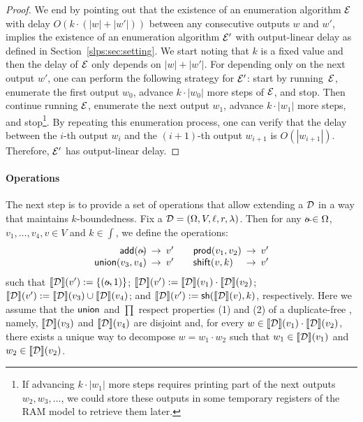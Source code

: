 \begin{proof}
	We end by pointing out that the existence of an enumeration algorithm $\mathcal{E}$ with delay $O(k\cdot (|w| + |w'|))$ between any consecutive outputs $w$ and $w'$, implies the existence of an enumeration algorithm $\mathcal{E}'$ with output-linear delay as defined in Section~\ref{slps:sec:setting}. We start noting that $k$ is a fixed value and then the delay of $\mathcal{E}$ only depends on $|w| + |w'|$. For depending only on the next output $w'$, one can perform the following strategy for $\mathcal{E}'$: start by running~$\mathcal{E}$, enumerate the first output $w_0$, advance $k \cdot |w_0|$ more steps of $\mathcal{E}$, and stop. Then continue running $\mathcal{E}$, enumerate the next output $w_1$, advance $k \cdot |w_1|$ more steps, and stop\footnote{If advancing $k \cdot |w_1|$ more steps requires printing part of the next outputs $w_2, w_3, \ldots$, we could store these outputs in some temporary registers of the RAM model to retrieve them later.}. By repeating this enumeration process, one can verify that the delay between the $i$-th output $w_i$ and the $(i+1)$-th output $w_{i+1}$ is $O(|w_{i+1}|)$. Therefore, $\mathcal{E}'$ has output-linear delay. 
\end{proof}

\paragraph{Operations} 
The next step is to provide a set of operations that allow extending a \dsabbr{} $\mathcal{D}$ in a way that maintains $k$-boundedness. Fix a \dsabbr{} $\mathcal{D} = (\Omega, V, \ell, r, \lambda)$. Then for any $\oout \in \infAlph$, $v_1, \ldots, v_4, v \in V$ and $k\in\int$, we define the operations:
\[
\begin{array}{rclrclrcl}
	\add(\oout) \! \! \! &\to&\! \! \! v'  \ \ \ \ \ \  \prod(v_1, v_2) \! \! \! &\to&\! \! \! v'   \\  \union(v_3, v_4) \! \! \! &\to&\! \! \! v' \ \ \ \ \ \  \shiftop(v, k) \! \! \! \! \! &\to&\! \! \! v'
\end{array}
\]
such that $\sem{\cD}(v') := \{(\oout,1)\}$; ${\llbracket{\mathcal{D}}\rrbracket}(v') := {\llbracket{\mathcal{D}}\rrbracket}(v_1) \cdot {\llbracket{\mathcal{D}}\rrbracket}(v_2)$; ${\llbracket{\mathcal{D}}\rrbracket}(v') := {\llbracket{\mathcal{D}}\rrbracket}(v_3) \cup {\llbracket{\mathcal{D}}\rrbracket}(v_4)$; and ${\llbracket{\mathcal{D}}\rrbracket}(v') := \mathsf{sh}({\llbracket{\mathcal{D}}\rrbracket}(v), k)$, respectively.
Here we assume that the $\mathsf{union}$ and $\prod$ respect properties (1) and (2) of a duplicate-free \dsabbr{}, namely, ${\llbracket{\mathcal{D}}\rrbracket}(v_3)$ and ${\llbracket{\mathcal{D}}\rrbracket}(v_4)$ are disjoint and, for every $w \in {\llbracket{\mathcal{D}}\rrbracket}(v_1) \cdot {\llbracket{\mathcal{D}}\rrbracket}(v_2)$, there exists a unique way to decompose $w = w_1 \cdot w_2$ such that $w_1 \in {\llbracket{\mathcal{D}}\rrbracket}(v_1)$ and $w_2 \in {\llbracket{\mathcal{D}}\rrbracket}(v_2)$.

